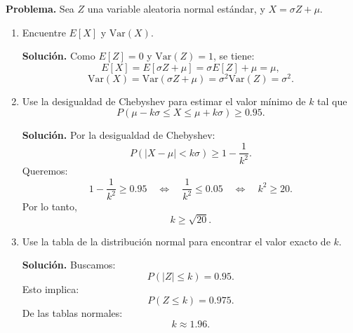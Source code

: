 \documentclass[11pt]{article}
\begin{document}
\textbf{Problema.} Sea $Z$ una variable aleatoria normal estándar, y $X=\sigma Z+\mu$.

\begin{enumerate}
    \item[a)] Encuentre $E[X]$ y $\mathrm{Var}(X)$.

    \textbf{Solución.} Como $E[Z]=0$ y $\mathrm{Var}(Z)=1$, se tiene:
    \[
        E[X]=E[\sigma Z+\mu]=\sigma E[Z]+\mu=\mu,
    \]
    \[
        \mathrm{Var}(X)=\mathrm{Var}(\sigma Z+\mu)=\sigma^2 \mathrm{Var}(Z)=\sigma^2.
    \]

    \item[b)] Use la desigualdad de Chebyshev para estimar el valor mínimo de $k$ tal que
    \[
        P(\mu - k\sigma \le X \le \mu + k\sigma) \ge 0.95.
    \]

    \textbf{Solución.} Por la desigualdad de Chebyshev:
    \[
        P(|X-\mu| < k\sigma) \ge 1 - \frac{1}{k^2}.
    \]
    Queremos:
    \[
        1 - \frac{1}{k^2} \ge 0.95
        \quad\Longleftrightarrow\quad
        \frac{1}{k^2} \le 0.05
        \quad\Longleftrightarrow\quad
        k^2 \ge 20.
    \]
    Por lo tanto,
    \[
        k \ge \sqrt{20}.
    \]

    \item[c)] Use la tabla de la distribución normal para encontrar el valor exacto de $k$.

    \textbf{Solución.} Buscamos:
    \[
        P(|Z|\le k)=0.95.
    \]
    Esto implica:
    \[
        P(Z\le k)=0.975.
    \]
    De las tablas normales:
    \[
        k \approx 1.96.
    \]

\end{enumerate}
\end{document}
